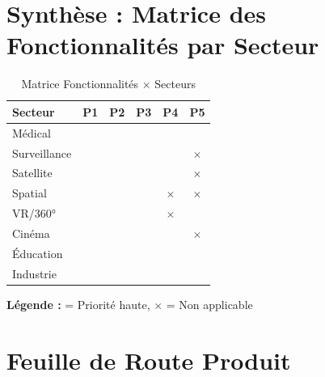 \documentclass[12pt,a4paper]{article}
\begin{document}
	\section{Synthèse : Matrice des Fonctionnalités par Secteur}
	
	\begin{table}[h]
		\centering
		\caption{Matrice Fonctionnalités $\times$ Secteurs}
		\label{tab:matrice}
		\begin{tabular}{@{}lccccc@{}}
			\toprule
			\textbf{Secteur} & \textbf{P1} & \textbf{P2} & \textbf{P3} & \textbf{P4} & \textbf{P5} \\ \midrule
			Médical & \checkmark & \checkmark & \checkmark & \checkmark & \checkmark \\
			Surveillance & \checkmark & \checkmark & \checkmark & \checkmark & $\times$ \\
			Satellite & \checkmark & \checkmark & \checkmark & \checkmark & $\times$ \\
			Spatial & \checkmark & \checkmark & \checkmark & $\times$ & $\times$ \\
			VR/360° & \checkmark & \checkmark & \checkmark & $\times$ & \checkmark \\
			Cinéma & \checkmark & \checkmark & \checkmark & \checkmark & $\times$ \\
			Éducation & \checkmark & \checkmark & \checkmark & \checkmark & \checkmark \\
			Industrie & \checkmark & \checkmark & \checkmark & \checkmark & \checkmark \\
			\bottomrule
		\end{tabular}
	\end{table}
	
	\textbf{Légende :} \checkmark = Priorité haute, $\times$ = Non applicable
	
	\section{Feuille de Route Produit}
	
\end{document}
